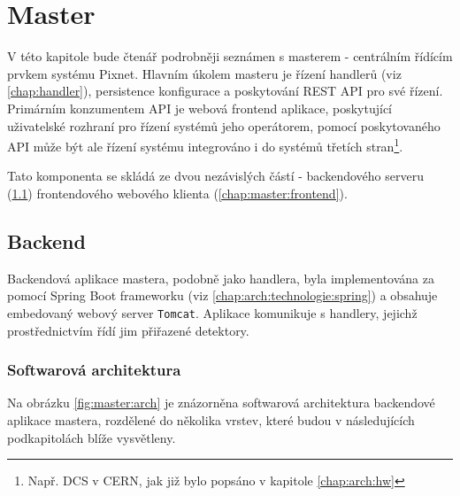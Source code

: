

\chapter{Master}\label{chap:master}
V této kapitole bude čtenář podrobněji seznámen s masterem - centrálním řídícím prvkem systému Pixnet. Hlavním úkolem masteru je řízení handlerů (viz \ref{chap:handler}), persistence konfigurace a poskytování REST API pro své řízení. Primárním konzumentem API je webová frontend aplikace, poskytující uživatelské rozhraní pro řízení systémů jeho operátorem, pomocí poskytovaného API může být ale řízení systému integrováno i do systémů třetích stran\footnote{Např. DCS v CERN, jak již bylo popsáno v kapitole \ref{chap:arch:hw}}.

Tato komponenta se skládá ze dvou nezávislých částí - backendového serveru (\ref{chap:master:backend}) frontendového webového klienta (\ref{chap:master:frontend}).

\section{Backend}\label{chap:master:backend}
Backendová aplikace mastera, podobně jako handlera, byla implementována za pomocí Spring Boot frameworku (viz \ref{chap:arch:technologie:spring}) a obsahuje embedovaný webový server \texttt{Tomcat}. Aplikace komunikuje s handlery, jejichž prostřednictvím řídí jim přiřazené detektory.

\subsection{Softwarová architektura}\label{chap:master:backend:sw_arch}
Na obrázku \ref{fig:master:arch} je znázorněna softwarová architektura backendové aplikace mastera, rozdělené do několika vrstev, které budou v následujících podkapitolách blíže vysvětleny.

